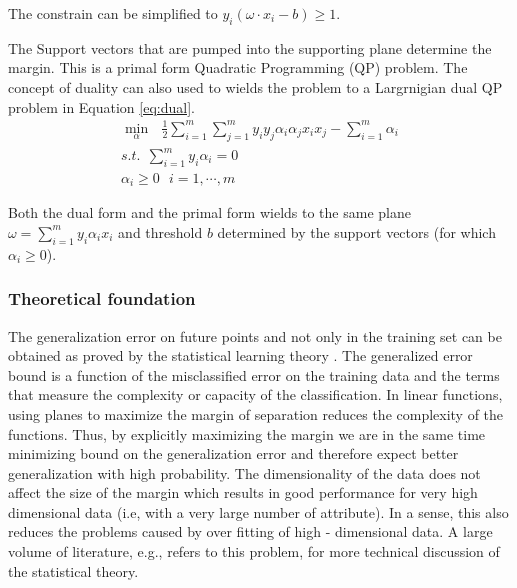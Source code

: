 The constrain can be simplified to $y_i(\omega \cdot x_i-b)\geq 1$. 

The Support vectors that are pumped into the supporting plane determine the margin. This is a primal form Quadratic Programming (QP) problem. The concept of duality can also used to wields the problem to a Largrnigian dual QP problem in Equation \ref{eq:dual}. 
\begin{equation}
\begin{array}{c}
\min_{\alpha} \ \ \   \frac{1}{2} \sum_{i=1}^{m}{\sum_{j=1}^{m}{y_iy_j\alpha_i\alpha_jx_ix_j}} - \sum_{i=1}^{m}{\alpha_i} \\
s.t. \ \ \sum_{i=1}^{m}{y_i\alpha_i}=0   \\
  \alpha_i \geq 0  \ \ \ i=1,\cdots , m 
  \end{array} 
\label{eq:dual}
\end{equation}

Both the dual form and the primal form wields to the same plane $\omega=\sum_{i=1}^{m}y_i\alpha_i x_i$ and threshold $b$ determined by the support vectors (for which $\alpha_i\geq 0$). 

\subsubsection{Theoretical foundation}

The generalization error on future points and not only in the training set can be obtained as proved by the statistical learning theory \cite{BennettSVMP2000}.  The generalized error bound is a function of the misclassified error on the training data and the terms that measure the complexity or capacity of the classification. In linear functions, using planes to maximize the margin of separation reduces the complexity of the functions. Thus, by explicitly maximizing the margin we are in the same time minimizing bound on the generalization error and therefore expect better generalization with high probability. The dimensionality of the data does not affect the size of the margin which   results in good performance for very high dimensional data (i.e, with a very large number of attribute). In a sense, this also reduces the problems caused by over fitting of high - dimensional data.  A large volume of literature, e.g., \cite{bookSVMoverfit11,statisticalSVM1} refers to this problem,  for more technical discussion of the   statistical theory. 


